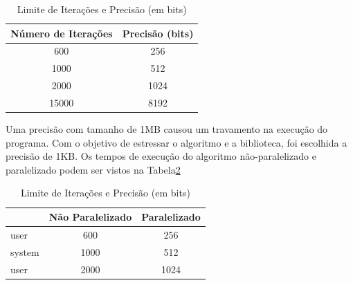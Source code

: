 \documentclass[12pt]{article}
\begin{document}
\begin{table}[h]
\centering
\caption{Limite de Iterações e Precisão (em bits)}
\begin{tabular}{|c|c|}
	\hline
	Número de Iterações & Precisão (bits)\\
	\hline
	600		& 256\\
	1000	& 512\\
	2000	& 1024\\
	15000	& 8192\\
	\hline
\end{tabular}
\label{tab:table01}
\end{table}

Uma precisão com tamanho de 1MB causou um travamento na execução do programa.
Com o objetivo de estressar o algoritmo e a biblioteca, foi escolhida a precisão de 1KB.
Os tempos de execução do algoritmo não-paralelizado e paralelizado podem ser vistos na
Tabela\ref{tab:table02}

\begin{table}[h]
	\centering
	\caption{Limite de Iterações e Precisão (em bits)}
	\begin{tabular}{|l|c|c|}
		\hline
		{}		& Não Paralelizado & Paralelizado \\
		\hline
		user 	& 600	& 256\\
		system 	& 1000	& 512\\
		user 	& 2000	& 1024\\
		\hline
	\end{tabular}
	\label{tab:table02}
\end{table}
	



\end{document}
